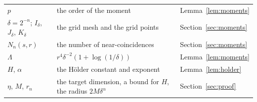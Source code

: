 \documentclass[11pt]{amsart}
\theoremstyle{remark}
\begin{document}
\begin{center}
\begin{tabular}{lll}
$p$ & the order of the moment & Lemma~\ref{lem:moments}\\
$\delta=2^{-n}$; $I_\delta$, $J_\delta$, $K_\delta$ & the grid mesh and the grid points & Section~\ref{sec:moments}\\
$N_n(s,r)$ & the number of near-coincidences & Section~\ref{sec:moments}\\
$\Lambda$ & $r^4\delta^{-2}(1+\log(1/\delta))$ & Lemma~\ref{lem:moments}\\
$H$, $\alpha$ & the H\"older constant and exponent & Lemma~\ref{lem:holder}\\
$\eta$, $M$, $r_n$ & the target dimension, a bound for $H$, the radius $2M\delta^\alpha$ & Section~\ref{sec:proof}\\
\bottomrule
\end{tabular}
\end{center}
\end{document}
